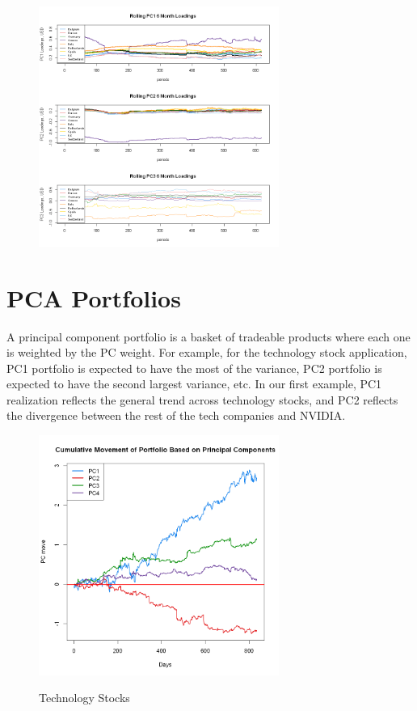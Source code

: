\documentclass{article}
\begin{document}
\begin{figure}[H]
    \caption{}
    \centering
    \includegraphics[width=0.7\textwidth]{index_6M_loading.png}
    \label{index-6m-loading}
\end{figure}

\section{PCA Portfolios}
A principal component portfolio is a basket of tradeable products where each one is weighted by the PC weight. For example, for the technology stock application, PC1 portfolio is expected to have the most of the variance, PC2 portfolio is expected to have the second largest variance, etc. In our first example, PC1 realization reflects the general trend across technology stocks, and PC2 reflects the divergence between the rest of the tech companies and NVIDIA. 

\begin{figure}[H]
    \caption{Technology Stocks}
    \centering
    \includegraphics[width=0.7\textwidth]{PC_port.png}
    \label{tech_pcport}
\end{figure}
\end{document}
